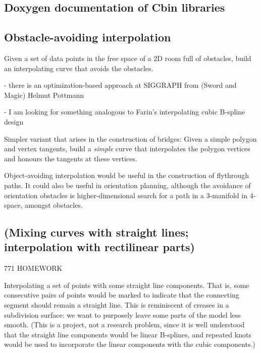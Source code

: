 \documentclass[11pt]{article}
\begin{document}

\subsection{Doxygen documentation of Cbin libraries}


\subsection{Obstacle-avoiding interpolation}

Given a set of data points in the free space of a 2D room full of obstacles,
build an interpolating curve that avoids the obstacles.

      - there is an optimization-based approach at SIGGRAPH from 
      (Sword and Magic) Helmut Pottmann

      - I am looking for something analogous to Farin's interpolating cubic B-spline design

Simpler variant that arises in the construction of bridges:
Given a simple polygon and vertex tangents, build a {\em simple} curve that
interpolates the polygon vertices and honours the tangents at these vertices.

Object-avoiding interpolation would be useful in the construction of flythrough paths.
It could also be useful in orientation planning, although the avoidance of orientation
obstacles is higher-dimensional search for a path in a 3-manifold in 4-space, 
amongst obstacles.


\subsection{(Mixing curves with straight lines; interpolation with rectilinear parts)}

771 HOMEWORK

Interpolating a set of points with some straight line components.
That is, some consecutive pairs of points would be marked to indicate that the connecting
segment should remain a straight line.
This is reminiscent of creases in a subdivision surface: we want to purposely leave some parts
of the model less smooth.
(This is a project, not a research problem, since it is well understood that
the straight line components would be linear B-splines, and repeated knots would
be used to incorporate the linear components with the cubic components.)
\end{document}
